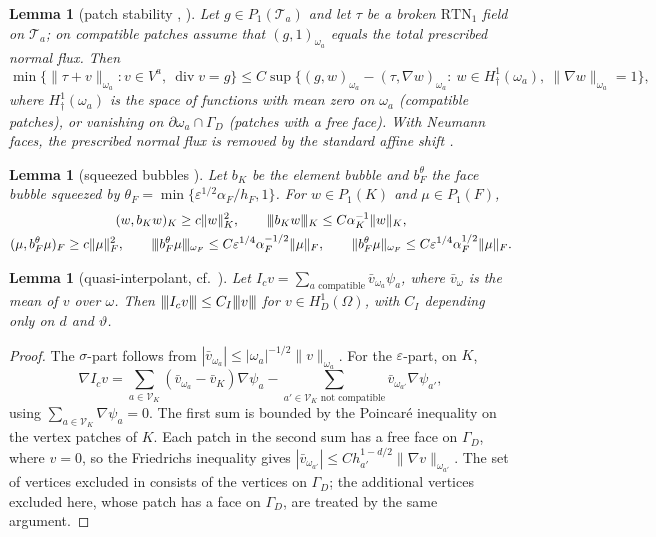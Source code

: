 \documentclass[11pt]{article}
\newcommand{\tnorm}[1]{\lvert\kern-0.25ex\lvert\kern-0.25ex\lvert #1\rvert\kern-0.25ex\rvert\kern-0.25ex\rvert}
\newcommand{\eps}{\varepsilon}
\newcommand{\RTN}{\mathrm{RTN}_1}
\newcommand{\dv}{\operatorname{div}}
\theoremstyle{plain}
\newtheorem{lemma}[theorem]{Lemma}
\theoremstyle{remark}
\numberwithin{equation}{section}
\begin{document}
\begin{lemma}[patch stability {\cite[Lemma~4.1]{SV20}}, \cite{EV15}]\label{tool:A2}
Let $g\in P_1(\mathcal T_a)$ and let $\tau$ be a broken $\RTN$ field on $\mathcal T_a$; on compatible
patches assume that $(g,1)_{\omega_a}$ equals the total prescribed normal flux. Then
\[
  \min\bigl\{\|\tau+v\|_{\omega_a}:v\in V^a,\ \dv v=g\bigr\}
  \le C\sup\bigl\{(g,w)_{\omega_a}-(\tau,\nabla w)_{\omega_a}:\ w\in H^1_\dagger(\omega_a),\ \|\nabla w\|_{\omega_a}=1\bigr\},
\]
where $H^1_\dagger(\omega_a)$ is the space of functions with mean zero on $\omega_a$ (compatible
patches), or vanishing on $\partial\omega_a\cap\Gamma_D$ (patches with a free face). With Neumann
faces, the prescribed normal flux is removed by the standard affine shift \cite{EV15}.
\end{lemma}

\begin{lemma}[squeezed bubbles {\cite[Lemma~3.6]{V05}}]\label{tool:A3}
Let $b_K$ be the element bubble and $b_F^\theta$ the face bubble squeezed by
$\theta_F=\min\{\eps^{1/2}\alpha_F/h_F,1\}$. For $w\in P_1(K)$ and $\mu\in P_1(F)$,
\begin{gather*}
  (w,b_Kw)_K\ge c\|w\|_K^2,\qquad \tnorm{b_Kw}_K\le C\alpha_K^{-1}\|w\|_K,\\
  (\mu,b_F^\theta\mu)_F\ge c\|\mu\|_F^2,\qquad
  \tnorm{b_F^\theta\mu}_{\omega_F}\le C\eps^{1/4}\alpha_F^{-1/2}\|\mu\|_F,\qquad
  \|b_F^\theta\mu\|_{\omega_F}\le C\eps^{1/4}\alpha_F^{1/2}\|\mu\|_F.
\end{gather*}
\end{lemma}

\begin{lemma}[quasi-interpolant, cf.\ {\cite[Lemma~3.3]{V05}}]\label{tool:A4}
Let $I_cv=\sum_{a\text{ compatible}}\bar v_{\omega_a}\psi_a$, where $\bar v_\omega$ is the mean of $v$
over $\omega$. Then $\tnorm{I_cv}\le C_I\tnorm{v}$ for $v\in H^1_D(\Omega)$, with $C_I$ depending
only on $d$ and $\vartheta$.
\end{lemma}

\begin{proof}
The $\sigma$-part follows from $|\bar v_{\omega_a}|\le|\omega_a|^{-1/2}\|v\|_{\omega_a}$. For the
$\eps$-part, on $K$,
\[
  \nabla I_cv=\sum_{a\in\mathcal V_K}(\bar v_{\omega_a}-\bar v_K)\nabla\psi_a
  -\sum_{a'\in\mathcal V_K\text{ not compatible}}\bar v_{\omega_{a'}}\nabla\psi_{a'},
\]
using $\sum_{a\in\mathcal V_K}\nabla\psi_a=0$. The first sum is bounded by the Poincar\'e inequality on
the vertex patches of $K$. Each patch in the second sum has a free face on $\Gamma_D$, where $v=0$, so
the Friedrichs inequality gives $|\bar v_{\omega_{a'}}|\le Ch_{a'}^{1-d/2}\|\nabla v\|_{\omega_{a'}}$.
The set of vertices excluded in \cite{V05} consists of the vertices on $\Gamma_D$; the additional
vertices excluded here, whose patch has a face on $\Gamma_D$, are treated by the same argument.
\end{proof}
\end{document}
